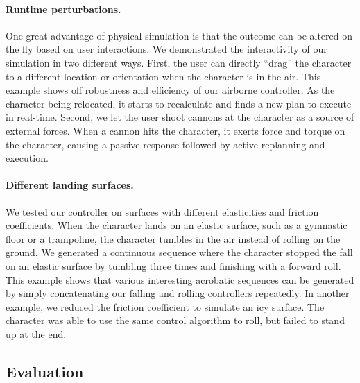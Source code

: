 \paragraph{Runtime perturbations.}
One great advantage of physical simulation is that the outcome can be
altered on the fly based on user interactions. We demonstrated the
interactivity of our simulation in two different ways. First, the user
can directly ``drag'' the character to a different location or
orientation when the character is in the air. This example shows off
robustness and efficiency of our airborne controller. As the character
being relocated, it starts to recalculate and finds a new plan to
execute in real-time. Second, we let the user shoot cannons at the
character as a source of external forces. When a cannon hits the
character, it exerts force and torque on the character, causing a
passive response followed by active replanning and execution.

\paragraph{Different landing surfaces.}
We tested our controller on surfaces with different elasticities and
friction coefficients. When the character lands on an elastic surface,
such as a gymnastic floor or a trampoline, the character tumbles in
the air instead of rolling on the ground. We generated a continuous
sequence where the character stopped the fall on an elastic surface by
tumbling three times and finishing with a forward roll. This example
shows that various interesting acrobatic sequences can be
generated by simply concatenating our falling and rolling controllers
repeatedly. In another example, we reduced the friction coefficient to
simulate an icy surface. The character was able to use the same control
algorithm to roll, but failed to stand up at the end.

\subsection{Evaluation}

